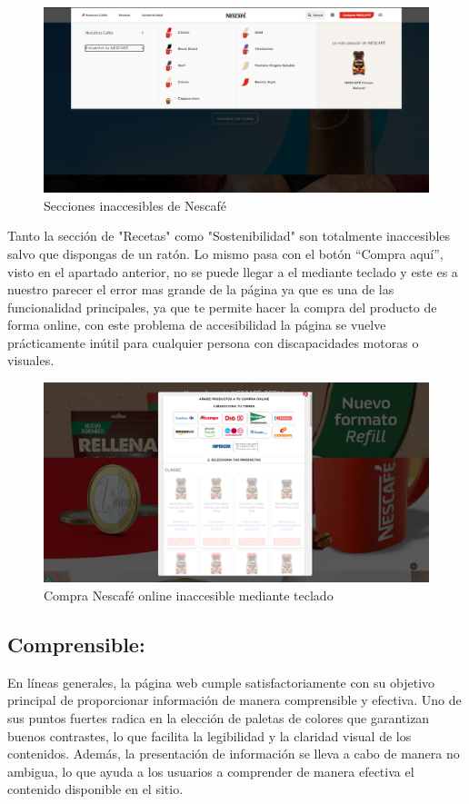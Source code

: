 \documentclass{article}
\begin{document}
\begin{figure}[!h]
        \centering
        \includegraphics[width=1\linewidth]{Imagen3.png}
        \caption{Secciones inaccesibles de Nescafé}
\end{figure}

Tanto la sección de "Recetas" como "Sostenibilidad" son totalmente inaccesibles salvo que dispongas de un ratón. Lo mismo pasa con el botón “Compra aquí”, visto en el apartado anterior, no se puede llegar a el mediante teclado y este es a nuestro parecer el error mas grande de la página ya que es una de las funcionalidad principales, ya que te permite hacer la compra del producto de forma online, con este problema de accesibilidad la página se vuelve prácticamente inútil para cualquier persona con discapacidades motoras o visuales.

\begin{figure}[!h] 
\centering
\includegraphics[width=0.5\linewidth]{Imagen4.png}
\caption{Compra Nescafé online inaccesible mediante teclado}
\end{figure}

\subsection{Comprensible:}
En líneas generales, la página web cumple satisfactoriamente con su objetivo principal de proporcionar información de manera comprensible y efectiva. Uno de sus puntos fuertes radica en la elección de paletas de colores que garantizan buenos contrastes, lo que facilita la legibilidad y la claridad visual de los contenidos. Además, la presentación de información se lleva a cabo de manera no ambigua, lo que ayuda a los usuarios a comprender de manera efectiva el contenido disponible en el sitio.
\end{document}
